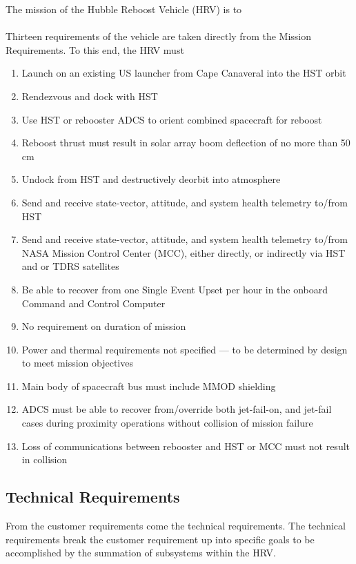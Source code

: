 \documentclass[paper=letter, fontsize=11pt]{scrartcl} %
\numberwithin{equation}{section} %
\numberwithin{figure}{section} %
\numberwithin{table}{section} %
\begin{document}
The mission of the Hubble Reboost Vehicle (HRV) is to
 \\
\\
Thirteen requirements of the vehicle are taken directly from the Mission Requirements. To this end, the HRV must
\begin{enumerate}[label=(\alph*)]
\item Launch on an existing US launcher from Cape Canaveral into the HST orbit
\item Rendezvous and dock with HST
\item Use HST or rebooster ADCS to orient combined spacecraft for reboost
\item Reboost thrust must result in solar array boom deflection of no more than 50 cm
\item Undock from HST and destructively deorbit into atmosphere
\item Send and receive state-vector, attitude, and system health telemetry to/from HST
\item Send and receive state-vector, attitude, and system health telemetry to/from NASA Mission Control Center (MCC), either directly, or indirectly via HST and or TDRS satellites
\item Be able to recover from one Single Event Upset per hour in the onboard Command and Control Computer
\item No requirement on duration of mission
\item Power and thermal requirements not specified --- to be determined by design to meet mission objectives
\item Main body of spacecraft bus must include MMOD shielding
\item ADCS must be able to recover from/override both jet-fail-on, and jet-fail cases during proximity operations without collision of mission failure
\item Loss of communications between rebooster and HST or MCC must not result in collision
\end{enumerate}

\subsection{Technical Requirements}

From the customer requirements come the technical requirements.  The technical requirements break the customer requirement up into specific goals to be accomplished by the summation of subsystems within the HRV.
\end{document}

